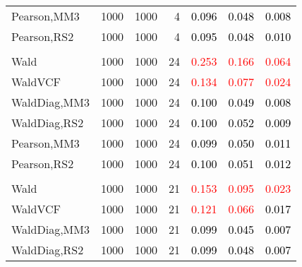 \documentclass[
]{article}
\begin{document}
\begin{table}[H]
{\begin{tabular}[t]{lrrrrrr}
\hspace{1em}Pearson,MM3 & 1000 & 1000 & 4 & \textcolor{black}{0.096} & \textcolor{black}{0.048} & \textcolor{black}{0.008}\\
\hspace{1em}Pearson,RS2 & 1000 & 1000 & 4 & \textcolor{black}{0.095} & \textcolor{black}{0.048} & \textcolor{black}{0.010}\\
\addlinespace[0.3em]
\multicolumn{7}{l}{\textbf{1F 15V}}\\
\hspace{1em}Wald & 1000 & 1000 & 24 & \textcolor{red}{0.253} & \textcolor{red}{0.166} & \textcolor{red}{0.064}\\
\hspace{1em}WaldVCF & 1000 & 1000 & 24 & \textcolor{red}{0.134} & \textcolor{red}{0.077} & \textcolor{red}{0.024}\\
\hspace{1em}WaldDiag,MM3 & 1000 & 1000 & 24 & \textcolor{black}{0.100} & \textcolor{black}{0.049} & \textcolor{black}{0.008}\\
\hspace{1em}WaldDiag,RS2 & 1000 & 1000 & 24 & \textcolor{black}{0.100} & \textcolor{black}{0.052} & \textcolor{black}{0.009}\\
\hspace{1em}Pearson,MM3 & 1000 & 1000 & 24 & \textcolor{black}{0.099} & \textcolor{black}{0.050} & \textcolor{black}{0.011}\\
\hspace{1em}Pearson,RS2 & 1000 & 1000 & 24 & \textcolor{black}{0.100} & \textcolor{black}{0.051} & \textcolor{black}{0.012}\\
\addlinespace[0.3em]
\multicolumn{7}{l}{\textbf{2F 10V}}\\
\hspace{1em}Wald & 1000 & 1000 & 21 & \textcolor{red}{0.153} & \textcolor{red}{0.095} & \textcolor{red}{0.023}\\
\hspace{1em}WaldVCF & 1000 & 1000 & 21 & \textcolor{red}{0.121} & \textcolor{red}{0.066} & \textcolor{black}{0.017}\\
\hspace{1em}WaldDiag,MM3 & 1000 & 1000 & 21 & \textcolor{black}{0.099} & \textcolor{black}{0.045} & \textcolor{black}{0.007}\\
\hspace{1em}WaldDiag,RS2 & 1000 & 1000 & 21 & \textcolor{black}{0.099} & \textcolor{black}{0.048} & \textcolor{black}{0.007}\\

\end{tabular}}
\end{table}
\end{document}
